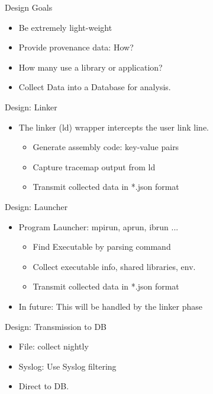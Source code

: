 \documentclass{beamer}
\begin{document}
\begin{frame}{Design Goals}
  \begin{itemize}
    \item Be extremely light-weight
    \item Provide provenance data: How?
    \item How many use a library or application?
    \item Collect Data into a Database for analysis.
  \end{itemize}
\end{frame}

\begin{frame}{Design: Linker }
  \begin{itemize}
    \item The linker (ld) wrapper intercepts the user link line.
      \begin{itemize}
        \item Generate assembly code: key-value pairs
        \item Capture tracemap output from ld
        \item Transmit collected data in *.json format
      \end{itemize}
  \end{itemize}
\end{frame}

\begin{frame}{Design: Launcher}
  \begin{itemize}
    \item Program Launcher: mpirun, aprun, ibrun ...
      \begin{itemize}
        \item Find Executable by parsing command
        \item Collect executable info, shared libraries, env.
        \item Transmit collected data in *.json format
      \end{itemize}
    \item In future: This will be handled by the linker phase
  \end{itemize}
\end{frame}

\begin{frame}{Design: Transmission to DB}
  \begin{itemize}
    \item File: collect nightly
    \item Syslog: Use Syslog filtering
    \item Direct to DB.
  \end{itemize}
\end{frame}
\end{document}
